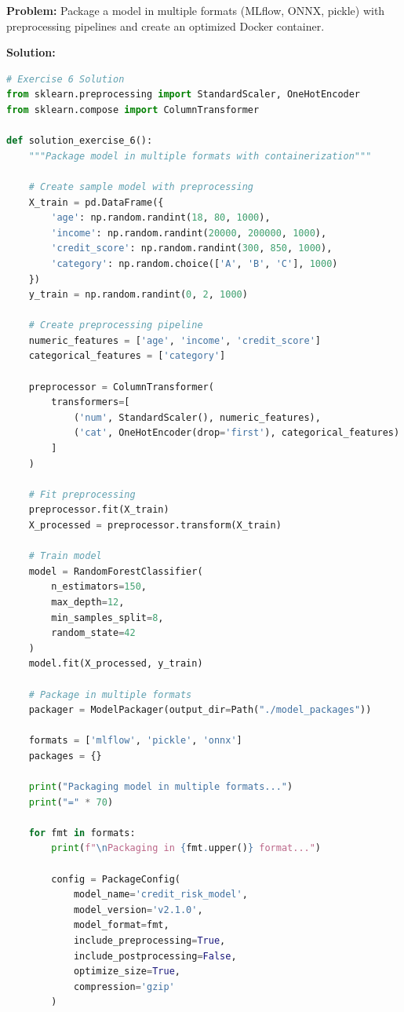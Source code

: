 \textbf{Problem:} Package a model in multiple formats (MLflow, ONNX, pickle) with preprocessing pipelines and create an optimized Docker container.

\textbf{Solution:}
\begin{lstlisting}[language=Python]
# Exercise 6 Solution
from sklearn.preprocessing import StandardScaler, OneHotEncoder
from sklearn.compose import ColumnTransformer

def solution_exercise_6():
    """Package model in multiple formats with containerization"""

    # Create sample model with preprocessing
    X_train = pd.DataFrame({
        'age': np.random.randint(18, 80, 1000),
        'income': np.random.randint(20000, 200000, 1000),
        'credit_score': np.random.randint(300, 850, 1000),
        'category': np.random.choice(['A', 'B', 'C'], 1000)
    })
    y_train = np.random.randint(0, 2, 1000)

    # Create preprocessing pipeline
    numeric_features = ['age', 'income', 'credit_score']
    categorical_features = ['category']

    preprocessor = ColumnTransformer(
        transformers=[
            ('num', StandardScaler(), numeric_features),
            ('cat', OneHotEncoder(drop='first'), categorical_features)
        ]
    )

    # Fit preprocessing
    preprocessor.fit(X_train)
    X_processed = preprocessor.transform(X_train)

    # Train model
    model = RandomForestClassifier(
        n_estimators=150,
        max_depth=12,
        min_samples_split=8,
        random_state=42
    )
    model.fit(X_processed, y_train)

    # Package in multiple formats
    packager = ModelPackager(output_dir=Path("./model_packages"))

    formats = ['mlflow', 'pickle', 'onnx']
    packages = {}

    print("Packaging model in multiple formats...")
    print("=" * 70)

    for fmt in formats:
        print(f"\nPackaging in {fmt.upper()} format...")

        config = PackageConfig(
            model_name='credit_risk_model',
            model_version='v2.1.0',
            model_format=fmt,
            include_preprocessing=True,
            include_postprocessing=False,
            optimize_size=True,
            compression='gzip'
        )


\end{lstlisting}
